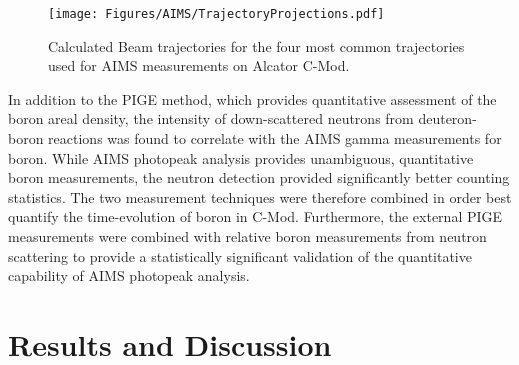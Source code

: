 \documentclass[final,3p,times,twocolumn]{elsarticle}
\begin{document}
%
\begin{figure}[h!]
 \centering
  \texttt{[image: Figures/AIMS/TrajectoryProjections.pdf]}
 \caption{Calculated Beam trajectories for the four most common trajectories used
for AIMS measurements on Alcator C-Mod.}
 \label{fig:TrajectoryProjections}
\end{figure}


In addition to the PIGE method, which provides quantitative assessment of the boron areal density, the intensity of down-scattered neutrons from deuteron-boron reactions was found to correlate with the AIMS gamma measurements for boron.  While AIMS photopeak analysis provides unambiguous, quantitative boron measurements, the neutron detection provided significantly better counting statistics.  The two measurement techniques were therefore combined in order best quantify the time-evolution of boron in C-Mod.  Furthermore, the external PIGE measurements were combined with relative boron measurements from neutron scattering to provide a statistically significant validation of the quantitative capability of AIMS photopeak analysis.


\section{Results and Discussion}
\end{document}
